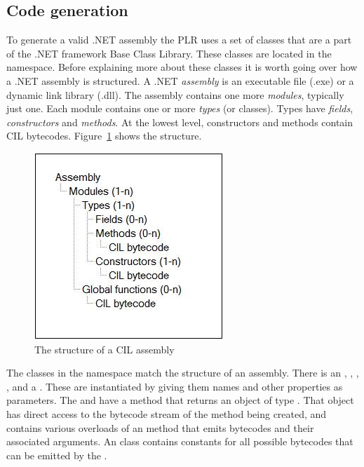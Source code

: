 \subsection{Code generation}
	
	To generate a valid .NET assembly the PLR uses a set of classes that are a 
	part of the .NET framework Base Class Library. These classes are located in 
	the  namespace. Before explaining more about 
	these classes it is worth going over how a .NET assembly is structured. A 
	.NET \textit{assembly} is an executable file (.exe) or a dynamic link 
	library (.dll). The assembly contains one more \textit{modules}, typically 
	just one. Each module contains one or more \textit{types} (or classes). 
	Types have \textit{fields}, \textit{constructors} and \textit{methods}. At 
	the lowest level, constructors and methods contain CIL bytecodes. 
	Figure~\ref{fig:assembly} shows the structure.

	\begin{figure}[h!]
		\centering
		\includegraphics{assembly2.jpg}
		\caption{The structure of a CIL assembly}
		\label{fig:assembly}
	\end{figure}
	
	The classes in the  namespace match the 
	structure of an assembly. There is an , 
	, , , 
	 and a . These are instantiated 
	by giving them names and other properties as parameters. The 
	 and  have a 
	 method that returns an object of type 
	. That object has direct access to the bytecode stream of 
	the method being created, and contains various overloads of an  
	method that emits bytecodes and their associated arguments. An 
	 class contains constants for all possible bytecodes that can 
	be emitted by the .
	
